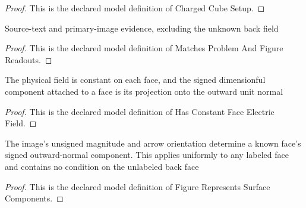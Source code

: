 \begin{proof}
  This is the declared model definition of Charged Cube Setup.
\end{proof}
\begin{definition}
  \label{def:physics:phyx-mini-0841:phyxminiproblems-problemphyxmini0841-matchesproblemandfigurereadouts}
  Source-text and primary-image evidence, excluding the unknown back field
\end{definition}
\begin{proof}
  This is the declared model definition of Matches Problem And Figure Readouts.
\end{proof}
\begin{definition}
  \label{def:physics:phyx-mini-0841:phyxminiproblems-problemphyxmini0841-hasconstantfaceelectricfield}
  The physical field is constant on each face, and the signed dimensionful component attached to a face is its projection onto the outward unit normal
\end{definition}
\begin{proof}
  This is the declared model definition of Has Constant Face Electric Field.
\end{proof}
\begin{definition}
  \label{def:physics:phyx-mini-0841:phyxminiproblems-problemphyxmini0841-figurerepresentssurfacecomponents}
  The image's unsigned magnitude and arrow orientation determine a known face's signed outward-normal component. This applies uniformly to any labeled face and contains no condition on the unlabeled back face
\end{definition}
\begin{proof}
  This is the declared model definition of Figure Represents Surface Components.
\end{proof}
